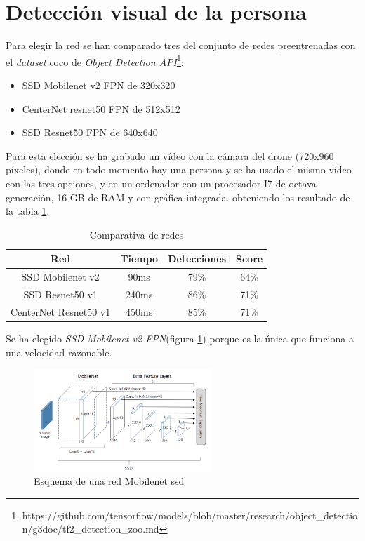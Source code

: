 \section{Detección visual de la persona}
Para elegir la red se han comparado tres del conjunto de redes preentrenadas con el \textit{dataset} \acrshort{coco} de \textit{Object Detection API}\footnote{https://github.com/tensorflow/models/blob/master/research/object_detection/g3doc/tf2_detection_zoo.md}:
\begin{itemize}
  \item SSD Mobilenet v2 FPN de 320x320
  \item CenterNet resnet50 FPN de 512x512
  \item SSD Resnet50 FPN de 640x640
\end{itemize}
Para esta elección se ha grabado un vídeo con la cámara del drone (720x960 píxeles), donde en todo momento hay una persona y se ha usado el mismo vídeo con las tres opciones, y en un ordenador con un procesador I7 de octava generación, 16 GB de RAM y con gráfica integrada. obteniendo los resultado de la tabla \ref{tab:comparativa_redes}.
\begin{table}[H]
\centering
\begin{tabular}{|c|c|c|c|}
\hline
\textbf{Red}          & \textbf{Tiempo} & \textbf{Detecciones} & \textbf{Score} \\ \hline 
SSD Mobilenet v2      & 90ms            & 79\%        & 64\%           \\ \hline  
SSD Resnet50 v1       & 240ms           & 86\%        & 71\%           \\\hline  
CenterNet Resnet50 v1 & 450ms           & 85\%        & 71\%           \\ \hline 
\end{tabular}
\caption{Comparativa de redes}
\label{tab:comparativa_redes}
\end{table}
Se ha elegido \textit{SSD Mobilenet v2 FPN}(figura \ref{fig:mobilenet}) porque es la única que funciona a una velocidad razonable.
\begin{figure}[H]
  \begin{center}
    \includegraphics[width=0.6\textwidth]{figures/real/mobilenet.png}
		\caption{Esquema de una red Mobilenet ssd}
		\label{fig:mobilenet}
		\end{center}
\end{figure}
